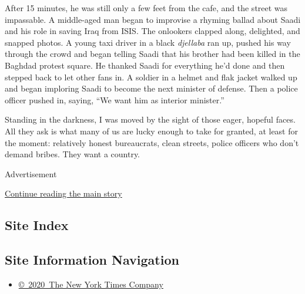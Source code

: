 After 15 minutes, he was still only a few feet from the cafe, and the
street was impassable. A middle-aged man began to improvise a rhyming
ballad about Saadi and his role in saving Iraq from ISIS. The onlookers
clapped along, delighted, and snapped photos. A young taxi driver in a
black \emph{djellaba} ran up, pushed his way through the crowd and began
telling Saadi that his brother had been killed in the Baghdad protest
square. He thanked Saadi for everything he'd done and then stepped back
to let other fans in. A soldier in a helmet and flak jacket walked up
and began imploring Saadi to become the next minister of defense. Then a
police officer pushed in, saying, ``We want him as interior minister.''

Standing in the darkness, I was moved by the sight of those eager,
hopeful faces. All they ask is what many of us are lucky enough to take
for granted, at least for the moment: relatively honest bureaucrats,
clean streets, police officers who don't demand bribes. They want a
country.

Advertisement

\protect\hyperlink{after-bottom}{Continue reading the main story}

\hypertarget{site-index}{%
\subsection{Site Index}\label{site-index}}

\hypertarget{site-information-navigation}{%
\subsection{Site Information
Navigation}\label{site-information-navigation}}

\begin{itemize}
\tightlist
\item
  \href{https://help.nytimes3xbfgragh.onion/hc/en-us/articles/115014792127-Copyright-notice}{©~2020~The
  New York Times Company}
\end{itemize}

